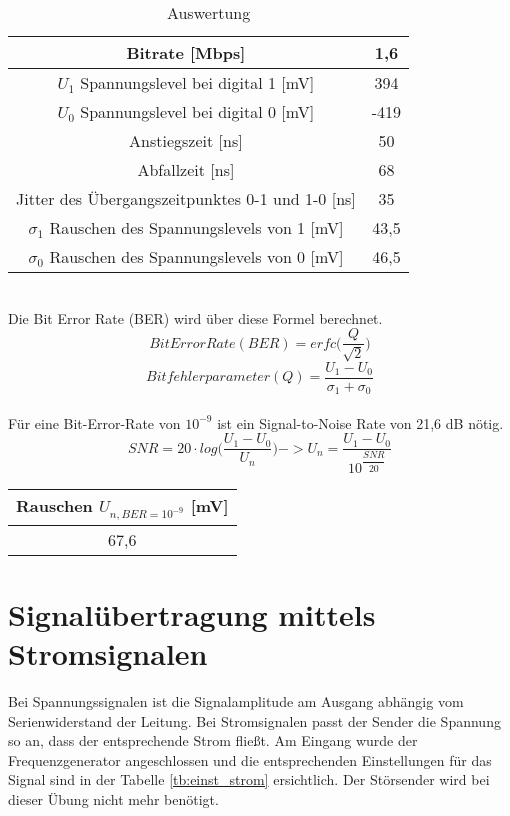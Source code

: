 \begin{table}[!h]
	\centering
	\begin{tabular}{|c|c|}
	\hline 
	Bitrate [Mbps]							& 1,6		\\ 
	\hline 
	$U_1$ Spannungslevel bei digital 1 [mV]				& 394		\\ 
	\hline 
	$U_0$ Spannungslevel bei digital 0 [mV]				& -419	\\ 
	\hline 
	Anstiegszeit [ns]							& 50		\\ 
	\hline 
	Abfallzeit [ns]							& 68		\\ 
	\hline 
	Jitter des Übergangszeitpunktes 0-1 und 1-0 [ns]		& 35		\\ 
	\hline 
	$\sigma_1$ Rauschen des Spannungslevels von 1 [mV]	& 43,5	\\ 
	\hline 
	$\sigma_0$ Rauschen des Spannungslevels von 0 [mV]	& 46,5	\\ 
	\hline 
	\end{tabular}
	\caption{Auswertung}
	\label{tb:auswertung_lvds}
\end{table}
~\\
Die Bit Error Rate (BER) wird über diese Formel berechnet.
\begin{equation}
	Bit Error Rate (BER) = erfc\bigg(\dfrac{Q}{\sqrt{2}}\bigg)
\end{equation}
\begin{equation}
	Bitfehlerparameter (Q) = \dfrac{U_1 - U_0}{\sigma_1 + \sigma_0}
\end{equation}
~\\
Für eine Bit-Error-Rate von $10^{-9}$ ist ein Signal-to-Noise Rate von 21,6 dB nötig.
\begin{equation}
	SNR = 20 \cdot log\bigg(\dfrac{U_1 - U_0}{U_n}\bigg) -> U_n = \dfrac{U_1- U_0}{10^{\dfrac{SNR}{20}}}
\end{equation}
\begin{table}[!h]
	\centering
	\begin{tabular}{|c|}
		\hline 
		Rauschen $U_{n, BER = 10^{-9}}$ [mV]		\\ 
		\hline 
		67,6		\\ 
		\hline 
	\end{tabular}
\end{table}



\section{Signalübertragung mittels Stromsignalen}
Bei Spannungssignalen ist die Signalamplitude am Ausgang abhängig vom Serienwiderstand der Leitung. Bei Stromsignalen passt der Sender die Spannung so an, dass der entsprechende Strom fließt. Am Eingang wurde der Frequenzgenerator angeschlossen und die entsprechenden Einstellungen für das Signal sind in der Tabelle \ref{tb:einst_strom} ersichtlich. Der Störsender wird bei dieser Übung nicht mehr benötigt.

